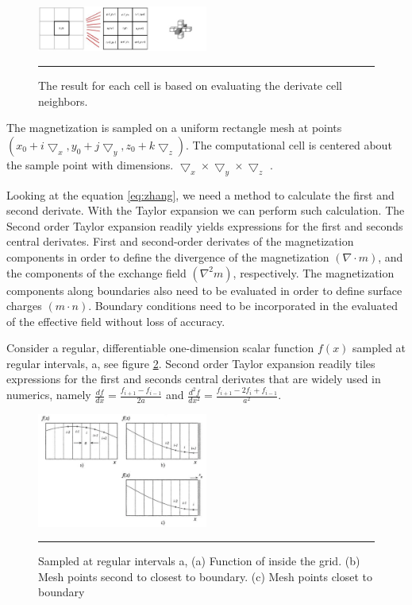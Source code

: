 \begin{figure}[htbp]
	\centering
		\includegraphics[width=0.5\textwidth]{Figures/fdtd.png}
		\rule{35em}{0.2pt}
	\caption[FDTD grid]{The result for each cell is based on evaluating the derivate cell neighbors.}
	\label{fig:fdtd}
\end{figure}

The magnetization is sampled on a uniform rectangle mesh at points $(x_0 + i\bigtriangledown_x, y_0 + j\bigtriangledown_y, z_0 + k\bigtriangledown_z)$. The computational cell is centered about the sample point with dimensions. $\bigtriangledown_x \times \bigtriangledown_y \times \bigtriangledown_z$ \cite{methods}.

Looking at the equation \ref{eq:zhang}, we need a method to calculate the first and second derivate. With the Taylor expansion we can perform such calculation. The Second order Taylor expansion readily yields expressions for the first and seconds central derivates. First and second-order derivates of the magnetization components in order to define the divergence  of the magnetization $(\nabla \cdot m)$, and the components of the exchange field $(\nabla^2m)$, respectively. The magnetization components along boundaries also need to be evaluated in order to define surface charges $(m \cdot n)$. Boundary conditions need to be incorporated in the evaluated of the effective field without loss of accuracy. 

Consider a regular, differentiable one-dimension  scalar function $f(x)$ sampled at regular intervals, a, see figure  \ref{fig:bound}. Second order Taylor expansion readily tiles expressions for the first and seconds central derivates that are widely used in numerics, namely $\frac{df}{dx} = \frac{f_{i+1} - f_{i-1}}{2a}$ and $\frac{d^2f}{dx^2} = \frac{f_{i+1} - 2f_i + f_{i-1}}{a^2}$.

\begin{figure}[htbp]
	\centering
		\includegraphics[width=0.5\textwidth]{Figures/bound.png}
		\rule{35em}{0.2pt}
	\caption[Sampled at regular intervals a, Taylor expansion]{Sampled at regular intervals a, (a) Function of inside the grid. (b) Mesh points second to closest to boundary. (c) Mesh points closet to boundary}
	\label{fig:bound}
\end{figure}

